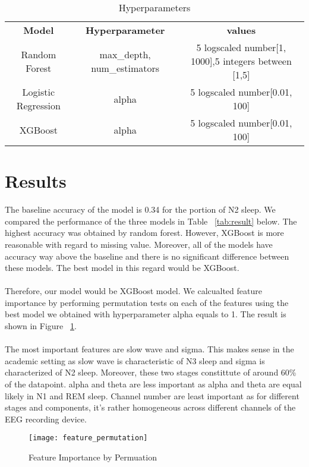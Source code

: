 \begin{table}[hb]
\centering
\caption{Hyperparameters} 
\begin{tabular}{ c c c }
 \textbf{Model} & \textbf{Hyperparameter} & \textbf{values} \\ 
 Random Forest & max\_depth, num\_estimators & 5 logscaled number[1, 1000],5 integers between [1,5] \\  
 Logistic Regression & alpha & 5 logscaled number[0.01, 100]\\
 XGBoost & alpha & 5 logscaled number[0.01, 100]
\end{tabular}
\label{tab:hyper} 
\end{table}

\section*{Results}
The baseline accuracy of the model is 0.34 for the portion of N2 sleep. We compared the performance of the three models in Table ~\ref{tab:result} below. The highest accuracy was obtained by random forest. However, XGBoost is more reasonable with regard to missing value. Moreover, all of the models have accuracy way above the baseline and there is no significant difference between these models. The best model in this regard would be XGBoost. \\
\\
Therefore, our model would be XGBoost model. We calcualted feature importance by performing permutation tests on each of the features using the best model we obtained with hyperparameter alpha equals to 1. The result is shown in Figure ~\ref{fig:permutation}. \\
\\
The most important features are slow wave and sigma. This makes sense in the academic setting as slow wave is characteristic of N3 sleep and sigma is characterized of N2 sleep. Moreover, these two stages constittute of around 60\% of the datapoint. alpha and theta are less important as alpha and theta are equal likely in N1 and REM sleep. Channel number are least important as for different stages and components, it's rather homogeneous across different channels of the EEG recording device.\\  

\begin{figure}[ht]
  \texttt{[image: feature\_permutation]}
  \caption{Feature Importance by Permuation}
  \label{fig:permutation}
\end{figure} 

